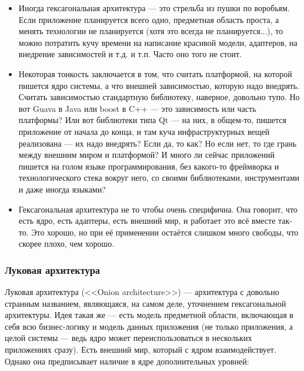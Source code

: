 \documentclass{../../text-style}
\begin{document}
\begin{itemize}
    \item Иногда гексагональная архитектура --- это стрельба из пушки по воробьям. Если приложение планируется всего одно, предметная область проста, а менять технологии не планируется (хотя это всегда не планируется...), то можно потратить кучу времени на написание красивой модели, адаптеров, на внедрение зависимостей и т.д. и т.п. Часто оно того не стоит.
    \item Некоторая тонкость заключается в том, что считать платформой, на которой пишется ядро системы, а что внешней зависимостью, которую надо внедрять. Считать зависимостью стандартную библиотеку, наверное, довольно тупо. Но вот Guava в Java или boost в C++ --- это зависимость или часть платформы? Или вот библиотеки типа Qt --- на них, в общем-то, пишется приложение от начала до конца, и там куча инфраструктурных вещей реализована --- их надо внедрять? Если да, то как? Но если нет, то где грань между внешним миром и платформой? И много ли сейчас приложений пишется на голом языке программирования, без какого-то фреймворка и технологического стека вокруг него, со своими библиотеками, инструментами и даже иногда языками?
    \item Гексагональная архитектура не то чтобы очень специфична. Она говорит, что есть ядро, есть адаптеры, есть внешний мир, и работает это всё вместе так-то. Это хорошо, но при её применении остаётся слишком много свободы, что скорее плохо, чем хорошо.
\end{itemize}

\subsubsection{Луковая архитектура}

Луковая архитектура (<<Onion architecture>>) --- архитектура с довольно странным названием, являющаяся, на самом деле, уточнением гексагональной архитектуры. Идея такая же --- есть модель предметной области, включающая в себя всю бизнес-логику и модель данных приложения (не только приложения, а целой системы --- ведь ядро может переиспользоваться в нескольких приложениях сразу). Есть внешний мир, который с ядром взаимодействует. Однако она предписывает наличие в ядре дополнительных уровней:
\end{document}
